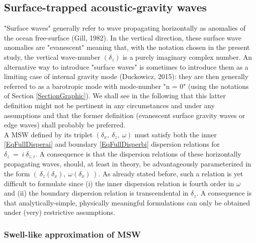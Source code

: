 \documentclass[a4paper,11pt]{article}
\begin{document}
\subsection{Surface-trapped acoustic-gravity waves}
\label{SubSectionGraphicMSW}

"Surface waves" generally refer to wave propagating horizontally as anomalies of the ocean free-surface (Gill, 1982). In the vertical direction, these surface wave anomalies are "evanescent" meaning that, with the notation chosen in the present study, the vertical wave-number $(\delta_z)$ is a purely imaginary complex number. An alternative way to introduce "surface waves" is sometimes to introduce them as a limiting case of internal gravity mode (Duckowicz, 2015): they are then generally referred to as a barotropic mode with mode-number "n = 0" (using the notations of Section \ref{SectionGraphic}). We shall see in the following that this latter definition might not be pertinent in any circumstances and under any assumptions and that the former definition (evanescent surface gravity waves or edge waves) shall probably be preferred.\\
A MSW defined by its triplet $(\delta_x,\ \delta_z,\ \omega)$ must satisfy both the inner \ref{EqFullDisperai} and boundary \ref{EqFullDisperbi} dispersion relations for $\delta_z\ =\ i\ \delta_{z,i}$. A consequence is that the dispersion relations of these horizontally propagating waves, should, at least in theory, be advantageously parameterized in the form $(\ \delta_z(\delta_x),\ \omega(\delta_x)\ )$. As already stated before, such a relation is yet difficult to formulate since (i) the inner dispersion relation is fourth order in $\omega$ and (ii) the boundary dispersion relation is transcendental in $\delta_z$. A consequence is that analytically-simple, physically meaningful formulations can only be obtained under (very) restrictive assumptions.\\ 

\subsubsection{Swell-like approximation of MSW}
\end{document}
